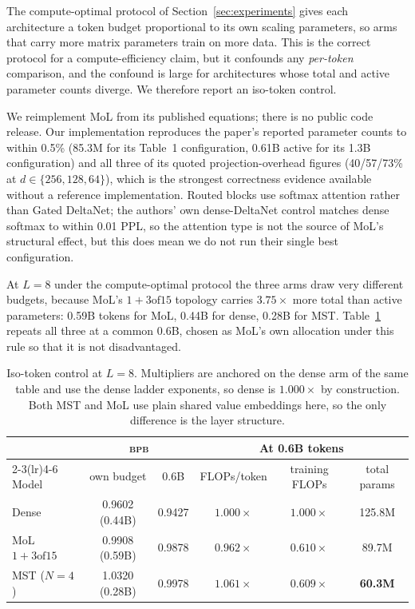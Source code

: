 \documentclass{article}
\newcommand{\bpb}{\textsc{bpb}}
\newcommand{\dsub}{d}
\newcommand{\nsub}{N}
\begin{document}
The compute-optimal protocol of Section~\ref{sec:experiments} gives each
architecture a token budget proportional to its own scaling parameters, so arms
that carry more matrix parameters train on more data. This is the correct
protocol for a compute-efficiency claim, but it confounds any \emph{per-token}
comparison, and the confound is large for architectures whose total and active
parameter counts diverge. We therefore report an iso-token control.

We reimplement MoL \citep{ternovtsii2026mol} from its published equations; there
is no public code release. Our implementation reproduces the paper's reported
parameter counts to within 0.5\% (85.3M for its Table~1 configuration, 0.61B
active for its 1.3B configuration) and all three of its quoted projection-overhead
figures (40/57/73\% at $\dsub \in \{256,128,64\}$), which is the strongest
correctness evidence available without a reference implementation. Routed blocks
use softmax attention rather than Gated DeltaNet; the authors' own dense-DeltaNet
control matches dense softmax to within 0.01 PPL, so the attention type is not the
source of MoL's structural effect, but this does mean we do not run their single
best configuration.

At $L{=}8$ under the compute-optimal protocol the three arms draw very different
budgets, because MoL's $1{+}3\text{of}15$ topology carries $3.75\times$ more total
than active parameters: 0.59B tokens for MoL, 0.44B for dense, 0.28B for MST.
Table~\ref{tab:isotoken} repeats all three at a common 0.6B, chosen as MoL's own
allocation under this rule so that it is not disadvantaged.

\begin{table}[t]
\caption{Iso-token control at $L{=}8$. Multipliers are anchored on the dense arm
of the same table and use the dense ladder exponents, so dense is $1.000\times$ by
construction. Both MST and MoL use plain shared value embeddings here, so the
only difference is the layer structure.}
\label{tab:isotoken}
\begin{center}
\begin{small}
\begin{tabular}{lccccc}
\toprule
& \multicolumn{2}{c}{\bpb} & \multicolumn{3}{c}{At 0.6B tokens} \\
\cmidrule(lr){2-3}\cmidrule(lr){4-6}
Model & own budget & 0.6B & FLOPs/token & training FLOPs & total params \\
\midrule
Dense & 0.9602 (0.44B) & 0.9427 & $1.000\times$ & $1.000\times$ & 125.8M \\
MoL $1{+}3\text{of}15$ & 0.9908 (0.59B) & 0.9878 & $0.962\times$ & $0.610\times$ & 89.7M \\
MST ($\nsub{=}4$) & 1.0320 (0.28B) & 0.9978 & $\mathbf{1.061\times}$ & $0.609\times$ & \textbf{60.3M} \\
\bottomrule
\end{tabular}
\end{small}
\end{center}
\end{table}
\end{document}
